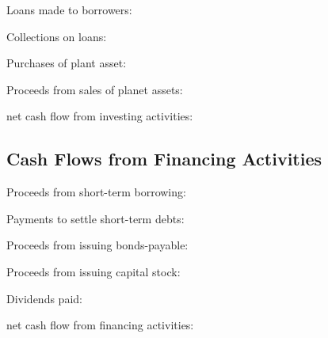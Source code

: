 \documentclass[10pt, a4paper]{article}
\begin{document}
    Loans made to borrowers:

    Collections on loans:

    Purchases of plant asset:

    Proceeds from sales of planet assets:

    net cash flow from investing activities:

\subsection*{Cash Flows from Financing Activities}
    Proceeds from short-term borrowing:

    Payments to settle short-term debts: 

    Proceeds from issuing bonds-payable: 

    Proceeds from issuing capital stock: 

    Dividends paid: 

    net cash flow from financing activities: 
\end{document}
